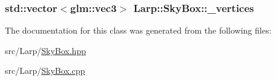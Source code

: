 \subsubsection[{\texorpdfstring{\+\_\+vertices}{_vertices}}]{\setlength{\rightskip}{0pt plus 5cm}std\+::vector$<$glm\+::vec3$>$ Larp\+::\+Sky\+Box\+::\+\_\+vertices\hspace{0.3cm}{\ttfamily [private]}}\hypertarget{classLarp_1_1SkyBox_ab4174c418ecd405b91f6c3ee70edf1f7}{}\label{classLarp_1_1SkyBox_ab4174c418ecd405b91f6c3ee70edf1f7}


The documentation for this class was generated from the following files\+:\begin{DoxyCompactItemize}
\item 
src/\+Larp/\hyperlink{SkyBox_8hpp}{Sky\+Box.\+hpp}\item 
src/\+Larp/\hyperlink{SkyBox_8cpp}{Sky\+Box.\+cpp}\end{DoxyCompactItemize}
